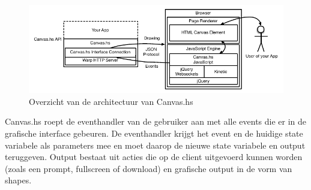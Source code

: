 \begin{figure}[H]
\begin{center}
\includegraphics[keepaspectratio,width=\textwidth]{./images/architectuur_overzicht.pdf}
\caption{Overzicht van de architectuur van Canvas.hs}
\label{fig:overzicht_architectuur}
\end{center}
\end{figure}


Canvas.hs roept de eventhandler van de gebruiker aan met alle events die er in de grafische interface gebeuren. De eventhandler krijgt het event en de huidige state variabele als parameters mee en moet daarop de nieuwe state variabele en output teruggeven. Output bestaat uit acties die op de client uitgevoerd kunnen worden (zoals een prompt, fullscreen of download) en grafische output in de vorm van shapes.
